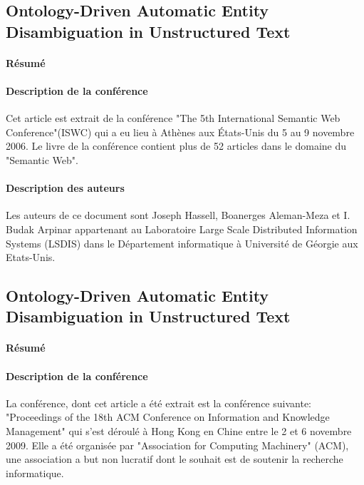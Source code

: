 \documentclass{article}
\begin{document}
\subsection{Ontology-Driven Automatic Entity Disambiguation in Unstructured Text\cite{article-6}}
\paragraph{Résumé}


\paragraph{Description de la conférence}
Cet article est extrait de la conférence "The 5th International Semantic Web Conference"(ISWC) qui a eu lieu à Athènes aux États-Unis du 5 au 9 novembre 2006. Le livre de la conférence contient plus de 52 articles dans le domaine du "Semantic Web".

\paragraph{Description des auteurs}
Les auteurs de ce document sont Joseph Hassell, Boanerges Aleman-Meza et I. Budak Arpinar appartenant au Laboratoire Large Scale Distributed Information Systems (LSDIS) dans le Département informatique à Université de Géorgie aux Etats-Unis.

\subsection{Ontology-Driven Automatic Entity Disambiguation in Unstructured Text\cite{article-8}}
\paragraph{Résumé}


\paragraph{Description de la conférence}
La conférence, dont cet article a été extrait est la conférence suivante: "Proceedings of the 18th ACM Conference on Information and Knowledge Management" qui s'est déroulé à Hong Kong en Chine entre le 2 et 6 novembre 2009. Elle a été organisée par "Association for Computing Machinery" (ACM), une association a but non lucratif dont le souhait est de soutenir la recherche informatique.
\end{document}
